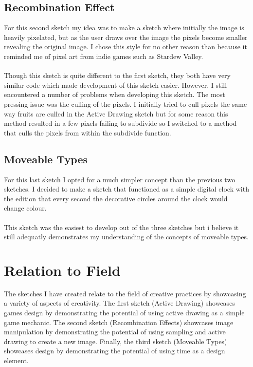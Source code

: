 \documentclass[12pt,a4paper]{article}
\begin{document}
		\subsection{Recombination Effect}
			For this second sketch my idea was to make a sketch where initially the image is heavily 
			pixelated, but as the user draws over the image the pixels become smaller revealing the 
			original image. I chose this style for no other reason than because it reminded me of pixel
			art from indie games such as Stardew Valley.\\\\Though this sketch is quite different to the 
			first sketch, they both have very similar code which made development of this sketch easier.
			However, I still encountered a number of problems when developing this sketch. The most 
			pressing issue was the culling of the pixels. I initially tried to cull pixels the same 
			way fruits are culled in the Active Drawing sketch but for some reason this method resulted 
			in a few pixels failing to subdivide so I switched to a method that culls the pixels from 
			within the subdivide function.

		\subsection{Moveable Types}
			For this last sketch I opted for a much simpler concept than the previous two sketches.
			I decided to make a sketch that functioned as a simple digital clock with the edition 
			that every second the decorative circles around the clock would change colour.\\\\This 
			sketch was the easiest to develop out of the three sketches but i believe it still
			adequatly demonstrates my understanding of the concepts of moveable types.
	
	\section{Relation to Field}
		The sketches I have created relate to the field of creative practices by showcasing a variety
		of aspects of creativity. The first sketch (Active Drawing) showcases games design by demonstrating
		the potential of using active drawing as a simple game mechanic. The second sketch (Recombination 
		Effects) showcases image manipulation by demonstrating the potential of using sampling and active 
		drawing to create a new image. Finally, the third sketch (Moveable Types) showcases design by 
		demonstrating the potential of using time as a design element.
\end{document}
